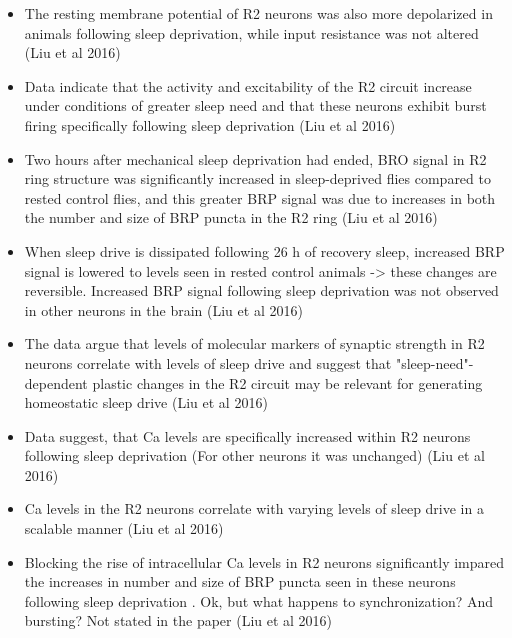 \documentclass[11pt]{article}
\begin{document}
\begin{itemize}
    \item The resting membrane potential of R2 neurons
    was also more depolarized in animals following sleep deprivation, while input resistance was not altered \parencite{liuSleepDriveEncoded2016}
    (Liu et al 2016)

    \item Data indicate that the activity and excitability of the R2 circuit increase under conditions of greater
    sleep need and that these neurons exhibit burst firing specifically following sleep deprivation \parencite{liuSleepDriveEncoded2016}
    (Liu et al 2016)

    \item Two hours after mechanical sleep deprivation had ended, BRO signal in R2 ring structure was significantly increased in sleep-deprived
    flies compared to rested control flies, and this greater BRP signal was due to increases in both the number and size
    of BRP puncta in the R2 ring \parencite{liuSleepDriveEncoded2016}
    (Liu et al 2016)

    \item When sleep drive is dissipated following 26 h of recovery sleep, increased BRP signal is lowered to levels seen in rested
    control animals -> these changes are reversible. Increased BRP signal following sleep
    deprivation was not observed in other neurons in the brain \parencite{liuSleepDriveEncoded2016}
    (Liu et al 2016)

    \item The data argue that levels of molecular markers of synaptic strength in R2 neurons correlate with levels of sleep
    drive and suggest that "sleep-need"-dependent plastic changes in the R2 circuit may be relevant for generating
    homeostatic sleep drive \parencite{liuSleepDriveEncoded2016}
    (Liu et al 2016)

    \item Data suggest, that Ca levels are specifically increased within R2 neurons following sleep deprivation (For other neurons
    it was unchanged) \parencite{liuSleepDriveEncoded2016}
    (Liu et al 2016)

    \item Ca levels in the R2 neurons correlate with varying levels of sleep drive in a scalable manner \parencite{liuSleepDriveEncoded2016}
    (Liu et al 2016)

    \item Blocking the rise of intracellular Ca levels in R2 neurons significantly impared the increases in number and size of BRP puncta
    seen in these neurons following sleep deprivation \parencite{liuSleepDriveEncoded2016}.
    Ok, but what happens to synchronization? And bursting? Not stated in the paper
    (Liu et al 2016)


\end{itemize}
\end{document}
